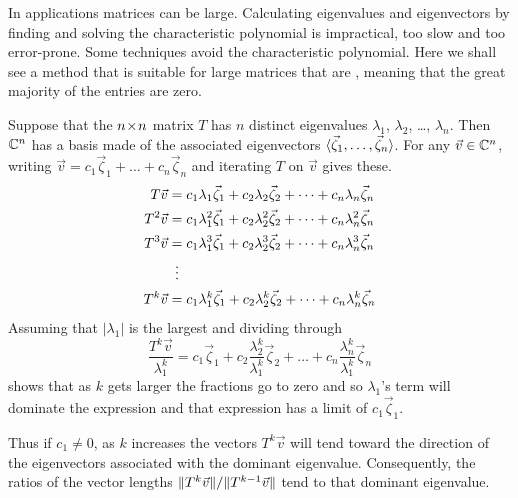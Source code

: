 In applications matrices can be large.
Calculating eigenvalues and eigenvectors by
finding and solving the characteristic polynomial is impractical, too slow
and too error-prone.
Some techniques avoid the characteristic polynomial. 
Here we shall see a method that is suitable for large matrices that are
, 
meaning that the great majority of the entries are zero.

Suppose that the $n \! \times \! n$ matrix $T$ has $n$ distinct eigenvalues
$\lambda_1$, $\lambda_2$, \ldots, $\lambda_n$.
Then $\mathbb{C}^n$ has a basis made of the associated eigenvectors
$\langle\vec{\zeta}_1,\dots,\vec{\zeta}_n\rangle$.
For any $\vec{v}\in\mathbb{C}^n$, writing
$\vec{v}=c_1\vec{\zeta}_1+\dots+c_n\vec{\zeta}_n$ and iterating $T$ on $\vec{v}$
gives these.
\begin{align*}
  T\vec{v} 
      &=c_1\lambda_1\vec{\zeta}_1+c_2\lambda_2\vec{\zeta}_2+
                              \dots+c_n\lambda_n\vec{\zeta}_n  \\
  T^2\vec{v} 
      &=c_1\lambda_1^2\vec{\zeta}_1+c_2\lambda_2^2\vec{\zeta}_2+
                              \dots+c_n\lambda_n^2\vec{\zeta}_n  \\
  T^3\vec{v} 
      &=c_1\lambda_1^3\vec{\zeta}_1+c_2\lambda_2^3\vec{\zeta}_2+
                              \dots+c_n\lambda_n^3\vec{\zeta}_n  \\
      &\vdotswithin{=}                                            \\
  T^k\vec{v} 
      &=c_1\lambda_1^k\vec{\zeta}_1+c_2\lambda_2^k\vec{\zeta}_2+
                              \dots+c_n\lambda_n^k\vec{\zeta}_n  
\end{align*}
Assuming that $|\lambda_1|$
is the largest and dividing through
\begin{equation*}
  \frac{T^k\vec{v}}{\lambda_1^k} 
      =c_1\vec{\zeta}_1+c_2\frac{\lambda_2^k}{\lambda_1^k}\vec{\zeta}_2+
                    \dots+c_n\frac{\lambda_n^k}{\lambda_1^k}\vec{\zeta}_n  
\end{equation*} 
shows that as $k$ gets larger the fractions go to zero
and so $\lambda_1$'s term will dominate the expression and
that expression has a limit of $c_1\vec{\zeta}_1$.

Thus if $c_1\neq 0$, 
as $k$ increases the vectors $T^k\vec{v}$ will tend toward the direction of 
the eigenvectors associated with the dominant eigenvalue.
Consequently,
the ratios  of the vector lengths $\lVert T^{k}\vec{v}\rVert/\lVert T^{k-1}\vec{v}\rVert$ 
tend to that dominant eigenvalue.

